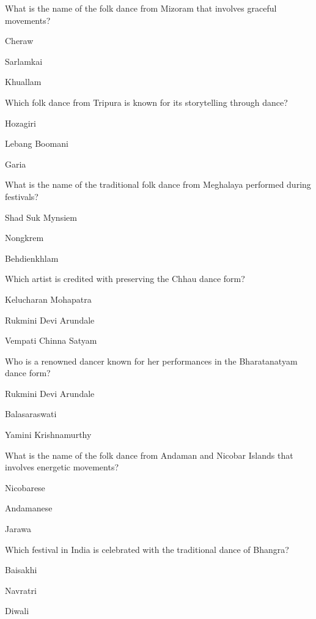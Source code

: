 \begin{enhancedmcq}{What is the name of the folk dance from Mizoram that involves graceful movements?}
\item Cheraw
\item Sarlamkai
\item Khuallam

\end{enhancedmcq}
\begin{enhancedmcq}{Which folk dance from Tripura is known for its storytelling through dance?}
\item Hozagiri
\item Lebang Boomani
\item Garia

\end{enhancedmcq}
\begin{enhancedmcq}{What is the name of the traditional folk dance from Meghalaya performed during festivals?}
\item Shad Suk Mynsiem
\item Nongkrem
\item Behdienkhlam

\end{enhancedmcq}
\begin{enhancedmcq}{Which artist is credited with preserving the Chhau dance form?}
\item Kelucharan Mohapatra
\item Rukmini Devi Arundale
\item Vempati Chinna Satyam

\end{enhancedmcq}
\begin{enhancedmcq}{Who is a renowned dancer known for her performances in the Bharatanatyam dance form?}
\item Rukmini Devi Arundale
\item Balasaraswati
\item Yamini Krishnamurthy

\end{enhancedmcq}
\begin{enhancedmcq}{What is the name of the folk dance from Andaman and Nicobar Islands that involves energetic movements?}
\item Nicobarese
\item Andamanese
\item Jarawa

\end{enhancedmcq}
\begin{enhancedmcq}{Which festival in India is celebrated with the traditional dance of Bhangra?}
\item Baisakhi
\item Navratri
\item Diwali

\end{enhancedmcq}
